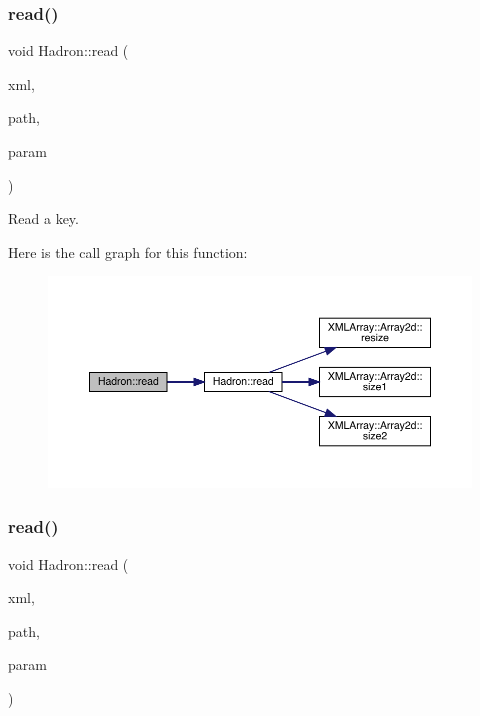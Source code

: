\subsubsection{\texorpdfstring{read()}{read()}\hspace{0.1cm}{\footnotesize\ttfamily [38/94]}}
{\footnotesize\ttfamily void Hadron\+::read (\begin{DoxyParamCaption}\item[{\mbox{\hyperlink{classADATXML_1_1XMLReader}{X\+M\+L\+Reader}} \&}]{xml,  }\item[{const std\+::string \&}]{path,  }\item[{\mbox{\hyperlink{structHadron_1_1KeyPropElementalOperator__t}{Key\+Prop\+Elemental\+Operator\+\_\+t}} \&}]{param }\end{DoxyParamCaption})}



Read a key. 

Here is the call graph for this function\+:\nopagebreak
\begin{figure}[H]
\begin{center}
\leavevmode
\includegraphics[width=350pt]{d1/daf/namespaceHadron_a3b1642acb606c69519cf7dd88a01fbfd_cgraph}
\end{center}
\end{figure}
\mbox{\label{namespaceHadron_a9a69bb90cd1c62da66808573864f7cd1}} 
\subsubsection{\texorpdfstring{read()}{read()}\hspace{0.1cm}{\footnotesize\ttfamily [39/94]}}
{\footnotesize\ttfamily void Hadron\+::read (\begin{DoxyParamCaption}\item[{\mbox{\hyperlink{classADATXML_1_1XMLReader}{X\+M\+L\+Reader}} \&}]{xml,  }\item[{const std\+::string \&}]{path,  }\item[{\mbox{\hyperlink{structHadron_1_1HadronAdjMapTarget__t}{Hadron\+Adj\+Map\+Target\+\_\+t}} \&}]{param }\end{DoxyParamCaption})}

